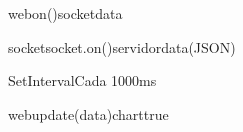 \begin {sequencediagram}



\begin{call}[1]{web}{on()}{socket}{data}
	\begin{call}[1]{socket}{socket.on()}{servidor}{data(JSON)}\end{call}
\end{call}

\begin{sdblock}[blue!10]{SetInterval}{Cada 1000ms}
	\begin{call}[1]{web}{update(data)}{chart}{true}\end{call}
\end{sdblock}

\end {sequencediagram}